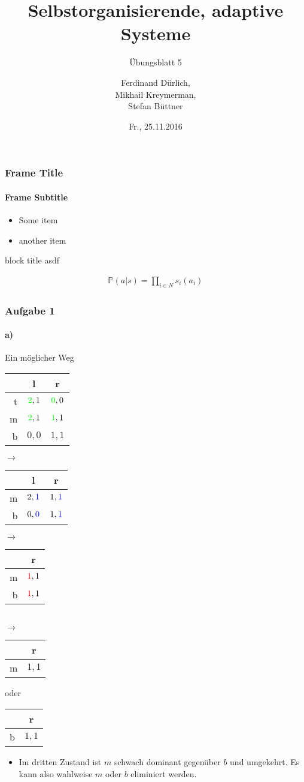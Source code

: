 \documentclass{beamer}
\title[SOAS]{Selbstorganisierende, adaptive Systeme}
\subtitle{Übungsblatt 5}
\author[Ferdinand, Mikhail, Stefan]{ %
Ferdinand Dürlich, \\
Mikhail Kreymerman, \\
Stefan Büttner
}
\institute[ISSE]{ %
Institut for Software \& Systems Engineering\\
Universität Augsburg
}
\date{Fr., 25.11.2016}
\begin{document}
\frame{\titlepage}

\begin{frame}
\frametitle{Frame Title}
\framesubtitle{Frame Subtitle}

\begin{itemize}
    \item Some item
    \item another item
\end{itemize}

\begin{block}{block title}
    asdf
\end{block}
\begin{align*}
    \mathbb{P}(a|s) = \prod_{i \in N} s_i(a_i)
\end{align*}
\end{frame}

\begin{frame}
	\frametitle{Aufgabe 1}
	\framesubtitle{a)}
	\begin{block}{Ein möglicher Weg}	
		\centering
		\begin{tabular}{r|c|c|}
			& l & r \\
			\hline
			t & $\textcolor{green}{2}, 1$ & $\textcolor{green}{0}, 0$ \\
			m & $\textcolor{green}{2}, 1$ & $\textcolor{green}{1}, 1$ \\
			b & $0, 0$ & $1, 1$ \\
			\hline
		\end{tabular}
		$\rightarrow$
		\begin{tabular}{r|c|c|}
			& l & r \\
			\hline
			m & $2, \textcolor{blue}{1}$ & $1, \textcolor{blue}{1}$ \\
			b & $0, \textcolor{blue}{0}$ & $1, \textcolor{blue}{1}$ \\
			\hline
		\end{tabular}
		$\rightarrow$
		\begin{tabular}{r|c|}
			& r \\
			\hline
			m & $\textcolor{red}{1}, 1$ \\
			b &  $\textcolor{red}{1}, 1$ \\
			\hline
		\end{tabular}\\
		$\rightarrow$
		\begin{tabular}{r|c|}
			& r \\
			\hline
			m & $1, 1$ \\
			\hline
		\end{tabular}
		oder
		\begin{tabular}{r|c|}
			& r \\
			\hline
			b &  $1, 1$ \\
			\hline
		\end{tabular}	
	\end{block}
	\begin{itemize}
		\item Im dritten Zustand ist $m$ schwach dominant gegenüber $b$ und umgekehrt. Es kann also wahlweise $m$ oder $b$ eliminiert werden.
	\end{itemize}
\end{frame}
\end{document}

